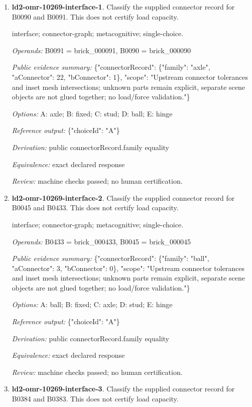 \begin{enumerate}
\item \textbf{ld2-omr-10269-interface-1}. Classify the supplied connector record for B0090 and B0091. This does not certify load capacity.
\par{\small interface; connector-graph; metacognitive; single-choice.\par\textit{Operands:} B0091 = brick\_000091, B0090 = brick\_000090\par\textit{Public evidence summary:} \{"connectorRecord": \{"family": "axle", "aConnector": 22, "bConnector": 1\}, "scope": "Upstream connector tolerances and inset mesh intersections; unknown parts remain explicit, separate scene objects are not glued together; no load/force validation."\}\par\textit{Options:} A: axle; B: fixed; C: stud; D: ball; E: hinge\par\textit{Reference output:} \{"choiceId": "A"\}\par\textit{Derivation:} public connectorRecord.family equality\par\textit{Equivalence:} exact declared response\par\textit{Review:} machine checks passed; no human certification.}
\item \textbf{ld2-omr-10269-interface-2}. Classify the supplied connector record for B0045 and B0433. This does not certify load capacity.
\par{\small interface; connector-graph; metacognitive; single-choice.\par\textit{Operands:} B0433 = brick\_000433, B0045 = brick\_000045\par\textit{Public evidence summary:} \{"connectorRecord": \{"family": "ball", "aConnector": 3, "bConnector": 0\}, "scope": "Upstream connector tolerances and inset mesh intersections; unknown parts remain explicit, separate scene objects are not glued together; no load/force validation."\}\par\textit{Options:} A: ball; B: fixed; C: axle; D: stud; E: hinge\par\textit{Reference output:} \{"choiceId": "A"\}\par\textit{Derivation:} public connectorRecord.family equality\par\textit{Equivalence:} exact declared response\par\textit{Review:} machine checks passed; no human certification.}
\item \textbf{ld2-omr-10269-interface-3}. Classify the supplied connector record for B0384 and B0383. This does not certify load capacity.

\end{enumerate}
